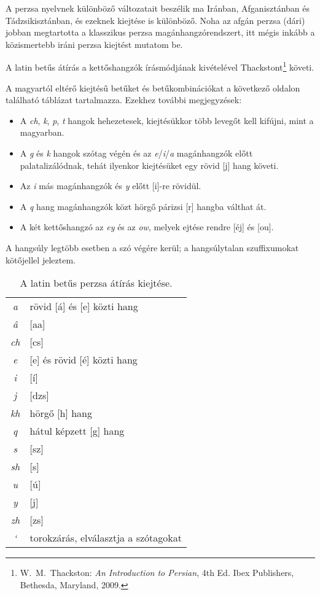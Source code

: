 A perzsa nyelvnek különböző változatait beszélik ma Iránban,
Afganisztánban és Tádzsikisztánban, és ezeknek kiejtése is
különböző. Noha az afgán perzsa (dári) jobban megtartotta a klasszikus perzsa
magánhangzórendszert, itt mégis inkább a közismertebb iráni
perzsa kiejtést mutatom be.

A latin betűs átírás a kettőshangzók írásmódjának kivételével
Thackstont\footnote{W.~M.~Thackston: \emph{An Introduction to Persian},
4th Ed. Ibex Publishers, Bethesda, Maryland, 2009.} követi.

A magyartól eltérő kiejtésű betűket és betűkombinációkat a következő
oldalon található táblázat tartalmazza. Ezekhez további megjegyzések:

\begin{itemize}
  \item A \emph{ch}, \emph{k}, \emph{p}, \emph{t} hangok hehezetesek,
    kiejtésükkor több levegőt kell kifújni, mint a magyarban.
  \item A \emph{g} és \emph{k} hangok szótag végén és az
    \emph{e}/\emph{i}/\emph{a} magánhangzók előtt palatalizálódnak,
    tehát ilyenkor kiejtésüket egy rövid [j] hang követi.
  \item Az \emph{i} más magánhangzók és \emph{y} előtt [i]-re rövidül.
  \item A \emph{q} hang magánhangzók közt hörgő párizsi [r] hangba
    válthat át.
  \item A két kettőshangzó az \emph{ey} és az \emph{ow}, melyek ejtése
    rendre [éj] és [ou].
\end{itemize}

A hangsúly legtöbb esetben a szó végére kerül; a hangsúlytalan
szuffixumokat kötőjellel jeleztem.

\begin{table}[h]
  \begin{center}
    \smallskip\smallskip
    \begin{tabular}{cl}
      \emph{a} & rövid [á] és [e] közti hang\\
      \emph{â} & [aa]\\
      \emph{ch} & [cs]\\
      \emph{e} & [e] és rövid [é] közti hang\\
      \emph{i} & [í]\\
      \emph{j} & [dzs]\\
      \emph{kh} & hörgő [h] hang\\
      \emph{q} & hátul képzett [g] hang\\
      \emph{s} & [sz]\\
      \emph{sh} & [s]\\
      \emph{u} & [ú]\\
      \emph{y} & [j]\\
      \emph{zh} & [zs]\\
      \emph{`} & torokzárás, elválasztja a szótagokat\\
    \end{tabular}
  \end{center}
  \caption{A latin betűs perzsa átírás kiejtése.}
\end{table}
